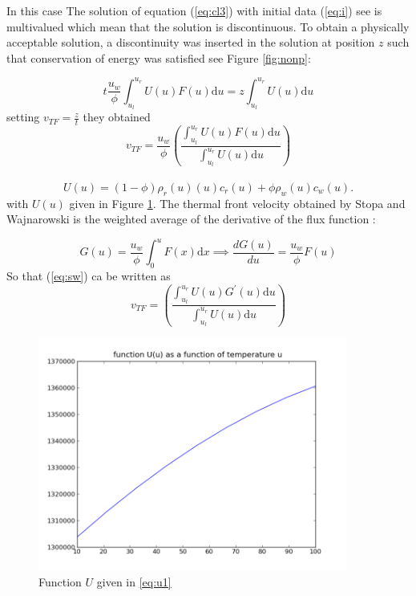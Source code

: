 In this case The solution of equation (\ref{eq:cl3}) with initial data (\ref{eq:i}) see \cite{Waj05} is multivalued which mean that the solution is discontinuous. To obtain a physically acceptable solution, a discontinuity was inserted in the solution at position $z$ such that conservation of energy was satisfied see Figure \ref{fig:nonp}:

\begin{equation}\label{eq:cew}
t\frac{u_{w}}{\phi}\int_{u_{l}}^{u_{r}} U(u)F(u)\mathrm{d}u=z\int_{u_{l}}^{u_{r}} U(u)\mathrm{d}u
\end{equation}
setting $v_{TF}=\frac{z}{t}$ they obtained
\begin{equation}\label{eq:sw}
v_{TF} = \frac{u_{w}}{\phi}\left(   \frac{\int_{u_{l}}^{u_{r}} U(u)F(u)\mathrm{d}u   }{ \int_{u_{l}}^{u_{r}} U(u)\mathrm{d}u    }    \right) 
\end{equation}
\\
\begin{equation}\label{eq:u1}
U(u) =(1-\phi)\rho_{r}(u)(u)c_{r}(u) + \phi \rho_{w}(u)c_{w}(u).
\end{equation}
with $U(u)$ given in Figure \ref{fig:fu}. The thermal front velocity obtained by Stopa and Wajnarowski is the weighted average of the derivative of the flux function :

\begin{equation}\label{eq:G1}
G(u) = \frac{u_{w}}{\phi}\int_{0}^{u}F(x)\mathrm{d}x \implies  \frac{d G(u)}{d u}=\frac{u_{w}}{\phi}F(u)\nonumber
\end{equation}
So that (\ref{eq:sw}) ca be written as
\begin{equation}\label{eq:sw1}
v_{TF} = \left(   \frac{\int_{u_{l}}^{u_{r}} U(u)G^{\prime}(u)\mathrm{d}u   }{ \int_{u_{l}}^{u_{r}} U(u)\mathrm{d}u    }    \right) 
\end{equation}



\begin{figure}[H] %
   \centering
   \includegraphics[width=4in]{fu.png} 
   \caption{Function $U$ given in \ref{eq:u1}}
   \label{fig:fu}
\end{figure}

